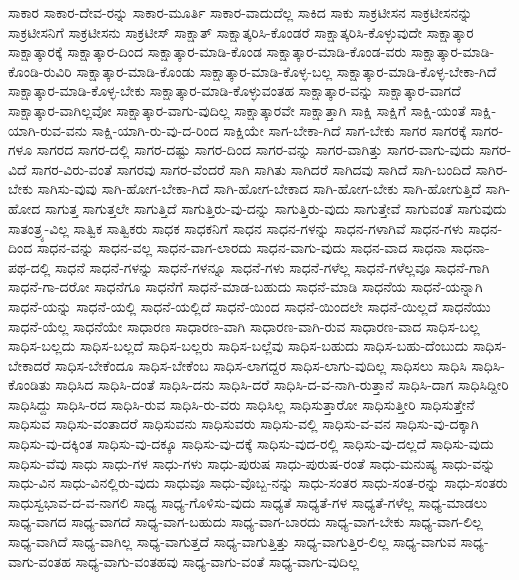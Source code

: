 {ಸಾಕಾರ
ಸಾಕಾರ-ದೇವ-ರನ್ನು
ಸಾಕಾರ-ಮೂರ್ತಿ
ಸಾಕಾರ-ವಾದುದೆಲ್ಲ
ಸಾಕಿದ
ಸಾಕು
ಸಾಕ್ರಟೀಸನ
ಸಾಕ್ರಟೀಸನನ್ನು
ಸಾಕ್ರಟೀಸನಿಗೆ
ಸಾಕ್ರಟೀಸನು
ಸಾಕ್ರಟೀಸ್
ಸಾಕ್ಷಾತ್
ಸಾಕ್ಷಾತ್ಕರಿಸಿ-ಕೊಂಡರೆ
ಸಾಕ್ಷಾತ್ಕರಿಸಿ-ಕೊಳ್ಳುವುದೇ
ಸಾಕ್ಷಾತ್ಕಾರ
ಸಾಕ್ಷಾತ್ಕಾರಕ್ಕೆ
ಸಾಕ್ಷಾತ್ಕಾರ-ದಿಂದ
ಸಾಕ್ಷಾತ್ಕಾರ-ಮಾಡಿ-ಕೊಂಡ
ಸಾಕ್ಷಾತ್ಕಾರ-ಮಾಡಿ-ಕೊಂಡ-ವರು
ಸಾಕ್ಷಾತ್ಕಾರ-ಮಾಡಿ-ಕೊಂಡಿ-ರುವಿರಿ
ಸಾಕ್ಷಾತ್ಕಾರ-ಮಾಡಿ-ಕೊಂಡು
ಸಾಕ್ಷಾತ್ಕಾರ-ಮಾಡಿ-ಕೊಳ್ಳ-ಬಲ್ಲ
ಸಾಕ್ಷಾತ್ಕಾರ-ಮಾಡಿ-ಕೊಳ್ಳ-ಬೇಕಾ-ಗಿದೆ
ಸಾಕ್ಷಾತ್ಕಾರ-ಮಾಡಿ-ಕೊಳ್ಳ-ಬೇಕು
ಸಾಕ್ಷಾತ್ಕಾರ-ಮಾಡಿ-ಕೊಳ್ಳುವಂತಹ
ಸಾಕ್ಷಾತ್ಕಾರ-ವನ್ನು
ಸಾಕ್ಷಾತ್ಕಾರ-ವಾಗದೆ
ಸಾಕ್ಷಾತ್ಕಾರ-ವಾಗಿಲ್ಲವೋ
ಸಾಕ್ಷಾತ್ಕಾರ-ವಾಗು-ವುದಿಲ್ಲ
ಸಾಕ್ಷಾತ್ಕಾರವೇ
ಸಾಕ್ಷಾತ್ತಾಗಿ
ಸಾಕ್ಷಿ
ಸಾಕ್ಷಿಗೆ
ಸಾಕ್ಷಿ-ಯಂತೆ
ಸಾಕ್ಷಿ-ಯಾಗಿ-ರುವ-ವನು
ಸಾಕ್ಷಿ-ಯಾಗಿ-ರು-ವು-ದ-ರಿಂದ
ಸಾಕ್ಷಿಯೇ
ಸಾಗ-ಬೇಕಾ-ಗಿದೆ
ಸಾಗ-ಬೇಕು
ಸಾಗರ
ಸಾಗರಕ್ಕೆ
ಸಾಗರ-ಗಳೂ
ಸಾಗರದ
ಸಾಗರ-ದಲ್ಲಿ
ಸಾಗರ-ದಷ್ಟು
ಸಾಗರ-ದಿಂದ
ಸಾಗರ-ವನ್ನು
ಸಾಗರ-ವಾಗಿತ್ತು
ಸಾಗರ-ವಾಗು-ವುದು
ಸಾಗರ-ವಿದೆ
ಸಾಗರ-ವಿರು-ವಂತೆ
ಸಾಗರವು
ಸಾಗರ-ವೆಂದರೆ
ಸಾಗಿ
ಸಾಗಿತು
ಸಾಗಿದರೆ
ಸಾಗಿದವು
ಸಾಗಿದೆ
ಸಾಗಿ-ಬಂದಿದೆ
ಸಾಗಿರ-ಬೇಕು
ಸಾಗಿಸು-ವುವು
ಸಾಗಿ-ಹೋಗ-ಬೇಕಾ-ಗಿದೆ
ಸಾಗಿ-ಹೋಗ-ಬೇಕಾದ
ಸಾಗಿ-ಹೋಗ-ಬೇಕು
ಸಾಗಿ-ಹೋಗುತ್ತಿದೆ
ಸಾಗಿ-ಹೋದ
ಸಾಗುತ್ತ
ಸಾಗುತ್ತಲೇ
ಸಾಗುತ್ತಿದೆ
ಸಾಗುತ್ತಿರು-ವು-ದನ್ನು
ಸಾಗುತ್ತಿರು-ವುದು
ಸಾಗುತ್ತೇವೆ
ಸಾಗುವಂತೆ
ಸಾಗುವುದು
ಸಾತಂತ್ರ್ಯ-ವಿಲ್ಲ
ಸಾತ್ವಿಕ
ಸಾತ್ವಿಕರು
ಸಾಧಕ
ಸಾಧಕನಿಗೆ
ಸಾಧನ
ಸಾಧನ-ಗಳನ್ನು
ಸಾಧನ-ಗಳಾಗಿವೆ
ಸಾಧನ-ಗಳು
ಸಾಧನ-ದಿಂದ
ಸಾಧನ-ವನ್ನು
ಸಾಧನ-ವಲ್ಲ
ಸಾಧನ-ವಾಗ-ಲಾರದು
ಸಾಧನ-ವಾಗು-ವುದು
ಸಾಧನ-ವಾದ
ಸಾಧನಾ
ಸಾಧನಾ-ಪಥ-ದಲ್ಲಿ
ಸಾಧನೆ
ಸಾಧನೆ-ಗಳನ್ನು
ಸಾಧನೆ-ಗಳನ್ನೂ
ಸಾಧನೆ-ಗಳು
ಸಾಧನೆ-ಗಳೆಲ್ಲ
ಸಾಧನೆ-ಗಳೆಲ್ಲವೂ
ಸಾಧನೆ-ಗಾಗಿ
ಸಾಧನೆ-ಗಾ-ದರೋ
ಸಾಧನೆಗೂ
ಸಾಧನೆಗೆ
ಸಾಧನೆ-ಮಾಡ-ಬಹುದು
ಸಾಧನೆ-ಮಾಡಿ
ಸಾಧನೆಯ
ಸಾಧನೆ-ಯನ್ನಾಗಿ
ಸಾಧನೆ-ಯನ್ನು
ಸಾಧನೆ-ಯಲ್ಲಿ
ಸಾಧನೆ-ಯಲ್ಲಿದೆ
ಸಾಧನೆ-ಯಿಂದ
ಸಾಧನೆ-ಯಿಂದಲೇ
ಸಾಧನೆ-ಯಿಲ್ಲದೆ
ಸಾಧನೆಯು
ಸಾಧನೆ-ಯೆಲ್ಲ
ಸಾಧನೆಯೇ
ಸಾಧಾರಣ
ಸಾಧಾರಣ-ವಾಗಿ
ಸಾಧಾರಣ-ವಾಗಿ-ರುವ
ಸಾಧಾರಣ-ವಾದ
ಸಾಧಿಸ-ಬಲ್ಲ
ಸಾಧಿಸ-ಬಲ್ಲದು
ಸಾಧಿಸ-ಬಲ್ಲದೆ
ಸಾಧಿಸ-ಬಲ್ಲರು
ಸಾಧಿಸ-ಬಲ್ಲೆವು
ಸಾಧಿಸ-ಬಹುದು
ಸಾಧಿಸ-ಬಹು-ದೆಂಬುದು
ಸಾಧಿಸ-ಬೇಕಾದರೆ
ಸಾಧಿಸ-ಬೇಕೆಂದೂ
ಸಾಧಿಸ-ಬೇಕೆಂಬ
ಸಾಧಿಸ-ಲಾಗದ್ದರ
ಸಾಧಿಸ-ಲಾಗು-ವುದಿಲ್ಲ
ಸಾಧಿಸಲು
ಸಾಧಿಸಿ
ಸಾಧಿಸಿ-ಕೊಂಡಿತು
ಸಾಧಿಸಿದ
ಸಾಧಿಸಿ-ದಂತೆ
ಸಾಧಿಸಿ-ದನು
ಸಾಧಿಸಿ-ದರೆ
ಸಾಧಿಸಿ-ದ-ವ-ನಾಗಿ-ರುತ್ತಾನೆ
ಸಾಧಿಸಿ-ದಾಗ
ಸಾಧಿಸಿದ್ದೀರಿ
ಸಾಧಿಸಿದ್ದು
ಸಾಧಿಸಿ-ರದ
ಸಾಧಿಸಿ-ರುವ
ಸಾಧಿಸಿ-ರು-ವರು
ಸಾಧಿಸಿಲ್ಲ
ಸಾಧಿಸುತ್ತಾರೋ
ಸಾಧಿಸುತ್ತೀರಿ
ಸಾಧಿಸುತ್ತೇನೆ
ಸಾಧಿಸುವ
ಸಾಧಿಸು-ವಂತಾದರೆ
ಸಾಧಿಸುವನು
ಸಾಧಿಸುವರು
ಸಾಧಿಸು-ವಲ್ಲಿ
ಸಾಧಿಸು-ವ-ವನ
ಸಾಧಿಸು-ವು-ದಕ್ಕಾಗಿ
ಸಾಧಿಸು-ವು-ದಕ್ಕಿಂತ
ಸಾಧಿಸು-ವು-ದಕ್ಕೂ
ಸಾಧಿಸು-ವು-ದಕ್ಕೆ
ಸಾಧಿಸು-ವುದ-ರಲ್ಲಿ
ಸಾಧಿಸು-ವು-ದಲ್ಲದೆ
ಸಾಧಿಸು-ವುದು
ಸಾಧಿಸು-ವೆವು
ಸಾಧು
ಸಾಧು-ಗಳ
ಸಾಧು-ಗಳು
ಸಾಧು-ಪುರುಷ
ಸಾಧು-ಪುರುಷ-ರಂತೆ
ಸಾಧು-ಮನುಷ್ಯ
ಸಾಧು-ವನ್ನು
ಸಾಧು-ವಿನ
ಸಾಧು-ವಿನಲ್ಲಿರು-ವುದು
ಸಾಧುವೂ
ಸಾಧು-ವೊಬ್ಬ-ನನ್ನು
ಸಾಧು-ಸಂತರ
ಸಾಧು-ಸಂತ-ರನ್ನು
ಸಾಧು-ಸಂತರು
ಸಾಧುಸ್ವಭಾವ-ದ-ವ-ನಾಗಲಿ
ಸಾಧ್ಯ
ಸಾಧ್ಯ-ಗೊಳಿಸು-ವುದು
ಸಾಧ್ಯತೆ
ಸಾಧ್ಯತೆ-ಗಳ
ಸಾಧ್ಯತೆ-ಗಳೆಲ್ಲ
ಸಾಧ್ಯ-ಮಾಡಲು
ಸಾಧ್ಯ-ವಾಗದ
ಸಾಧ್ಯ-ವಾಗದೆ
ಸಾಧ್ಯ-ವಾಗ-ಬಹುದು
ಸಾಧ್ಯ-ವಾಗ-ಬಾರದು
ಸಾಧ್ಯ-ವಾಗ-ಬೇಕು
ಸಾಧ್ಯ-ವಾಗ-ಲಿಲ್ಲ
ಸಾಧ್ಯ-ವಾಗಿದೆ
ಸಾಧ್ಯ-ವಾಗಿಲ್ಲ
ಸಾಧ್ಯ-ವಾಗುತ್ತದೆ
ಸಾಧ್ಯ-ವಾಗುತ್ತಿತ್ತು
ಸಾಧ್ಯ-ವಾಗುತ್ತಿರ-ಲಿಲ್ಲ
ಸಾಧ್ಯ-ವಾಗುವ
ಸಾಧ್ಯ-ವಾಗು-ವಂತಹ
ಸಾಧ್ಯ-ವಾಗು-ವಂತಹವು
ಸಾಧ್ಯ-ವಾಗು-ವಂತೆ
ಸಾಧ್ಯ-ವಾಗು-ವುದಿಲ್ಲ
}
